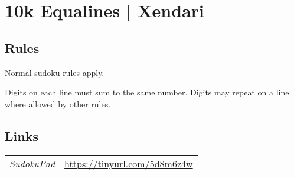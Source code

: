 \section{10k Equalines | {\normalfont Xendari}}
\label{sec:39-10k-equalines-xendari}

\subsection*{Rules}
\begin{markdown}
Normal sudoku rules apply.



Digits on each line must sum to the same number. Digits may repeat on a line where allowed by other rules.
\end{markdown}
\subsection*{Links}
\begin{tabularx}{\textwidth}{l X}
\emph{SudokuPad} & \url{https://tinyurl.com/5d8m6z4w} \\
\end{tabularx}
\pagebreak
